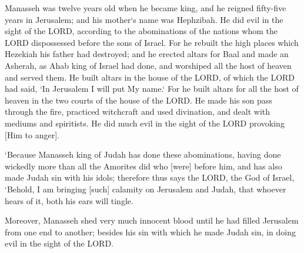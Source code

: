 \vspace{2\baselineskip}

\begin{scripture}[2 Kings 21:1-6]
    Manasseh was twelve years old when he became king, and he reigned fifty-five years in Jerusalem; and his mother`s name was Hephzibah.
    He did evil in the sight of the LORD, according to the abominations of the nations whom the LORD dispossessed before the sons of Israel.
    For he rebuilt the high places which Hezekiah his father had destroyed; and he erected altars for Baal and made an Asherah, as Ahab king of Israel had done, and worshiped all the host of heaven and served them.
    He built altars in the house of the LORD, of which the LORD had said, `In Jerusalem I will put My name.`
    For he built altars for all the host of heaven in the two courts of the house of the LORD.
    He made his son pass through the fire, practiced witchcraft and used divination, and dealt with mediums and spiritists. He did much evil in the sight of the LORD provoking [Him to anger].
\end{scripture}


\vspace{2\baselineskip}

\begin{scripture}[2 Kings 21:11-12]
    `Because Manasseh king of Judah has done these abominations, having done wickedly more than all the Amorites did who [were] before him, and has also made Judah sin with his idols;
    therefore thus says the LORD, the God of Israel, `Behold, I am bringing [such] calamity on Jerusalem and Judah, that whoever hears of it, both his ears will tingle.
\end{scripture}

\vspace{2\baselineskip}

\begin{scripture}[2 Kings 21:16]
    Moreover, Manasseh shed very much innocent blood until he had filled Jerusalem from one end to another; besides his sin with which he made Judah sin, in doing evil in the sight of the LORD.
\end{scripture}

